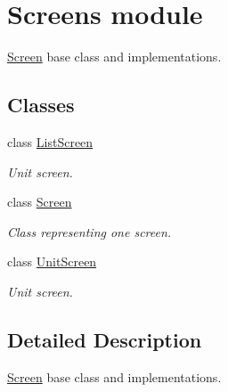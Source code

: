 \hypertarget{group__screens}{}\section{Screens module}
\label{group__screens}


\mbox{\hyperlink{classScreen}{Screen}} base class and implementations.  


\subsection*{Classes}
\begin{DoxyCompactItemize}
\item 
class \mbox{\hyperlink{classListScreen}{List\+Screen}}
\begin{DoxyCompactList}\small\item\em Unit screen. \end{DoxyCompactList}\item 
class \mbox{\hyperlink{classScreen}{Screen}}
\begin{DoxyCompactList}\small\item\em Class representing one screen. \end{DoxyCompactList}\item 
class \mbox{\hyperlink{classUnitScreen}{Unit\+Screen}}
\begin{DoxyCompactList}\small\item\em Unit screen. \end{DoxyCompactList}\end{DoxyCompactItemize}


\subsection{Detailed Description}
\mbox{\hyperlink{classScreen}{Screen}} base class and implementations. 

